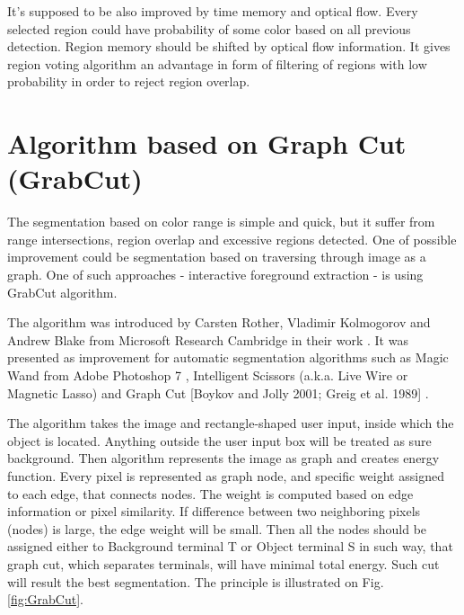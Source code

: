 \documentclass{ctuthesis}
\begin{document}
It's supposed to be also improved by time memory and optical flow. Every selected region could have probability of some color based on all previous detection. Region memory should be shifted by optical flow information. It gives region voting algorithm an advantage in form of filtering of regions with low probability in order to reject region overlap.


\section{Algorithm based on Graph Cut (GrabCut)}

The segmentation based on color range is simple and quick, but it suffer from range intersections, region overlap and excessive regions detected. One of possible improvement could be segmentation based on traversing through image as a graph. One of such approaches - interactive foreground extraction - is using GrabCut algorithm.

The algorithm was introduced by Carsten Rother, Vladimir Kolmogorov and Andrew Blake from Microsoft Research Cambridge in their work \cite{grabuct}. It was presented as improvement for automatic segmentation algorithms such as Magic Wand from Adobe Photoshop 7 \cite{adobe}, Intelligent Scissors (a.k.a. Live Wire or Magnetic Lasso) \cite{intsci} and Graph Cut [Boykov and Jolly 2001; Greig et al. 1989] \cite{graphcut}.

The algorithm takes the image and rectangle-shaped user input, inside which the object is located. Anything outside the user input box will be treated as sure background. Then algorithm represents the image as graph and creates energy function. Every pixel is represented as graph node, and specific weight assigned to each edge, that connects nodes. %
The weight is computed based on edge information or pixel similarity. If difference between two neighboring pixels (nodes) is large, the edge weight will be small. Then all the nodes should be assigned either to Background terminal T or Object terminal S in such way, that graph cut, which separates terminals, will have minimal total energy. Such cut will result the best segmentation. The principle is illustrated on Fig.\ref{fig:GrabCut}.
\end{document}
